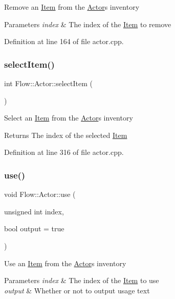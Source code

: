 Remove an \hyperlink{class_flow_1_1_item}{Item} from the \hyperlink{class_flow_1_1_actor}{Actor}\textquotesingle{}s inventory 
\begin{DoxyParams}{Parameters}
{\em index} & The index of the \hyperlink{class_flow_1_1_item}{Item} to remove \\
\hline
\end{DoxyParams}


Definition at line 164 of file actor.\+cpp.

\hypertarget{class_flow_1_1_actor_a648ab8280efed25bb52cb065199b1dd6}{}\label{class_flow_1_1_actor_a648ab8280efed25bb52cb065199b1dd6} 
\subsubsection{\texorpdfstring{select\+Item()}{selectItem()}}
{\footnotesize\ttfamily int Flow\+::\+Actor\+::select\+Item (\begin{DoxyParamCaption}{ }\end{DoxyParamCaption})}

Select an \hyperlink{class_flow_1_1_item}{Item} from the \hyperlink{class_flow_1_1_actor}{Actor}\textquotesingle{}s inventory \begin{DoxyReturn}{Returns}
The index of the selected \hyperlink{class_flow_1_1_item}{Item} 
\end{DoxyReturn}


Definition at line 316 of file actor.\+cpp.

\hypertarget{class_flow_1_1_actor_ad6b899f59bde8718624f61159083c74d}{}\label{class_flow_1_1_actor_ad6b899f59bde8718624f61159083c74d} 
\subsubsection{\texorpdfstring{use()}{use()}}
{\footnotesize\ttfamily void Flow\+::\+Actor\+::use (\begin{DoxyParamCaption}\item[{unsigned int}]{index,  }\item[{bool}]{output = {\ttfamily true} }\end{DoxyParamCaption})}

Use an \hyperlink{class_flow_1_1_item}{Item} from the \hyperlink{class_flow_1_1_actor}{Actor}\textquotesingle{}s inventory 
\begin{DoxyParams}{Parameters}
{\em index} & The index of the \hyperlink{class_flow_1_1_item}{Item} to use \\
\hline
{\em output} & Whether or not to output usage text \\
\hline
\end{DoxyParams}


